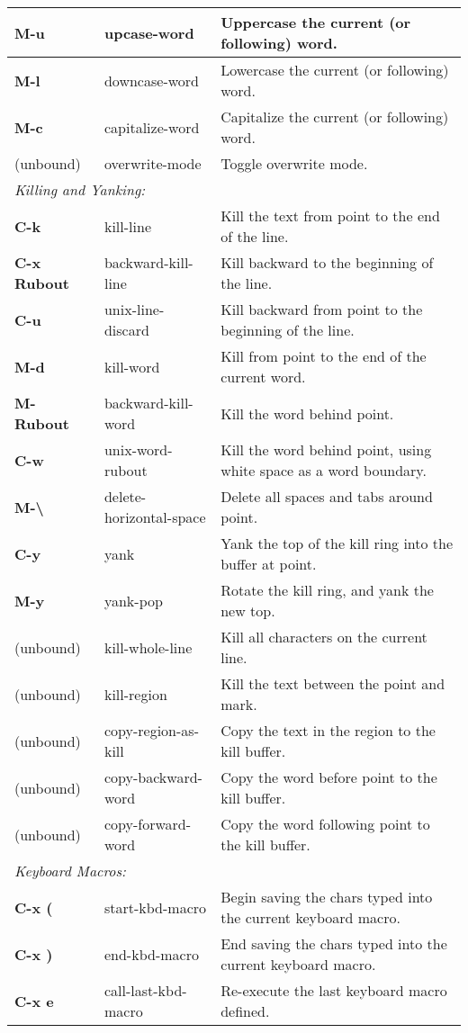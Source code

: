 \documentclass{article}
\begin{document}
\begin{tabular}{|p{3.5cm}|p{4cm}|p{10cm}|}
\hline
\textbf{M-u} & upcase-word & Uppercase the current (or following) word. \\
\hline
\textbf{M-l} & downcase-word & Lowercase the current (or following) word. \\
\hline
\textbf{M-c} & capitalize-word & Capitalize the current (or following) word. \\
\hline
(unbound) & overwrite-mode & Toggle overwrite mode. \\
\hline
\multicolumn{3}{|l|}{\small\it{Killing and Yanking:}} \\
\hline
\textbf{C-k} & kill-line & Kill the text from point to the end of the line. \\
\hline
\textbf{C-x Rubout} & backward-kill-line & Kill backward to the beginning of the line. \\
\hline
\textbf{C-u} & unix-line-discard & Kill backward from point to the beginning of the line. \\
\hline
\textbf{M-d} & kill-word & Kill from point to the end of the current word. \\
\hline
\textbf{M-Rubout} & backward-kill-word & Kill the word behind point. \\
\hline
\textbf{C-w} & unix-word-rubout & Kill the word behind point, using white space as a word boundary. \\
\hline
\textbf{M-\textbackslash} & delete-horizontal-space & Delete all spaces and tabs around point. \\
\hline
\textbf{C-y} & yank & Yank the top of the kill ring into the buffer at point. \\
\hline
\textbf{M-y} & yank-pop & Rotate the kill ring, and yank the new top. \\
\hline
(unbound) & kill-whole-line & Kill all characters on the current line. \\
(unbound) & kill-region & Kill the text between the point and mark. \\
(unbound) & copy-region-as-kill & Copy the text in the region to the kill buffer. \\
(unbound) & copy-backward-word & Copy the word before point to the kill buffer. \\
(unbound) & copy-forward-word & Copy the word following point to the kill buffer. \\
\hline
\multicolumn{3}{|l|}{\small\it{Keyboard Macros:}} \\
\hline
\textbf{C-x (} & start-kbd-macro & Begin saving the chars typed into the current keyboard macro. \\
\hline
\textbf{C-x )} & end-kbd-macro & End saving the chars typed into the current keyboard macro. \\
\hline
\textbf{C-x e} & call-last-kbd-macro & Re-execute the last keyboard macro defined. \\
\hline
\end{tabular}
\end{document}
